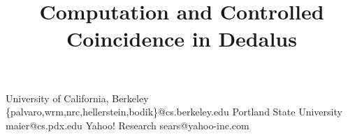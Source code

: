 \documentclass[preprint]{sigplanconf}
\begin{document}
\copyrightdata{[to be supplied]}

\title{Computation and Controlled Coincidence in Dedalus} 
%


           {University of California, Berkeley}
           {\{palvaro,wrm,nrc,hellerstein,bodik\}@cs.berkeley.edu}
           {Portland State University}
           {maier@cs.pdx.edu}
           {Yahoo! Research}
           {sears@yahoo-inc.com}
\maketitle
\end{document}
